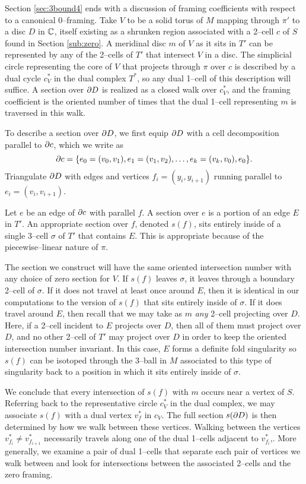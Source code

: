 Section \ref{sec:3bound4} ends with a discussion of framing coefficients with respect to a canonical 0--framing.
Take $V$ to be a solid torus of $M$ mapping through $\pi'$ to a disc $D$ in $\mathbb{C}$, itself existing as a shrunken region associated with a 2--cell $c$ of $S$ found in Section \ref{sub:zero}.
A meridinal disc $m$ of $V$ as it sits in $T'$ can be represented by any of the 2--cells of $T'$ that intersect $V$ in a disc.
The simplicial circle representing the core of $V$ that projects through $\pi$ over $c$ is described by a dual cycle $c_V^*$ in the dual complex $T^*$, so any dual 1--cell of this description will suffice.
A section over $\partial D$ is realized as a closed walk over $c_V^*$, and the framing coefficient is the oriented number of times that the dual 1--cell representing $m$ is traversed in this walk.

To describe a section over $\partial D$, we first equip $\partial D$ with a cell decomposition parallel to $\partial c$, which we write as
\[
	\partial c=\{e_0=(v_0,v_1),e_1=(v_1,v_2),\dots,e_k=(v_k,v_0),e_0\}.
\]
Triangulate $\partial D$ with edges and vertices $f_i=(y_i,y_{i+1})$ running parallel to $e_i=(v_i,v_{i+1})$.

Let $e$ be an edge of $\partial c$ with parallel $f$.
A section over $e$ is a portion of an edge $E$ in $T'$.
An appropriate section over $f$, denoted $s(f)$, sits entirely inside of a single 3--cell $\sigma$ of $T'$ that contains $E$.
This is appropriate because of the piecewise--linear nature of $\pi$.

The section we construct will have the same oriented intersection number with any choice of zero section for $V$.
If $s(f)$ leaves $\sigma$, it leaves through a boundary 2--cell of $\sigma$.
If it does not travel at least once around $E$, then it is identical in our computations to the version of $s(f)$ that sits entirely inside of $\sigma$.
If it does travel around $E$, then recall that we may take as $m$ \emph{any} 2--cell projecting over $D$.
Here, if a 2--cell incident to $E$ projects over $D$, then all of them must project over $D$, and no other 2--cell of $T'$ may project over $D$ in order to keep the oriented intersection number invariant.
In this case, $E$ forms a definite fold singularity so $s(f)$ can be isotoped through the 3--ball in $M$ associated to this type of singularity back to a position in which it sits entirely inside of $\sigma$.

We conclude that every intersection of $s(f)$ with $m$ occurs near a vertex of $S$.
Referring back to the representative circle $c_V^*$ in the dual complex, we may associate $s(f)$ with a dual vertex $v_f^*$ in $c_V$.
The full section $s(\partial D)$ is then determined by how we walk between these vertices.
Walking between the vertices $v_{f_i}^*\neq v_{f_{i+1}}^*$ necessarily travels along one of the dual 1--cells adjacent to $v_{f_i}^*$,.
More generally, we examine a pair of dual 1--cells that separate each pair of vertices we walk between and look for intersections between the associated 2--cells and the zero framing.

